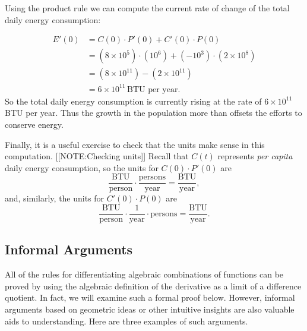 Using the product rule we can compute the current rate of change of
the total daily energy consumption:



\mbox{}



\begin{align*}
E'(0) &= C(0) \cdot P'(0) + C'(0) \cdot P(0) \\
      &= (8 \times 10^{5})\cdot (10^{6}) + (-10^{3})\cdot(2 \times 10^{8}) \\
      &= (8 \times 10^{11}) - (2 \times 10^{11}) \\
      &= 6 \times 10^{11} \, \mbox{BTU per year}.
\end{align*}
So the total daily energy consumption is currently rising at the rate
of $6 \times 10^{11}$ BTU per year.  Thus the growth in the population
more than offsets the efforts to conserve energy.

	Finally, it is a useful exercise to check that the units make sense in this computation.  
	[[NOTE:Checking units]]	
Recall that $C(t)$ represents {\em per capita} daily energy consumption, so the units for $C(0) \cdot P'(0)$ are
\[
\frac{\mbox {BTU}}{\mbox {person}} \cdot \frac{\mbox{persons}}{\mbox{year}} = \frac{\mbox{BTU}}{\mbox{year}},
\]
and, similarly, the units for $C'(0) \cdot P(0)$ are
\[
\frac{\mbox{BTU}}{\mbox{person}} \cdot \frac{1}{\mbox{year}} \cdot 
{\mbox {persons}} = \frac{\mbox{BTU}}{\mbox{year}}.
\]


\subsection{Informal Arguments}
\label{subsec:informal-arguments}

	All of the rules for differentiating algebraic combinations of functions can be proved by using the algebraic definition of the derivative as a limit of a difference quotient.  In fact, we will examine such a formal proof below.  However, informal arguments based on geometric ideas or other intuitive insights are also valuable aids to understanding.  Here are three examples of such arguments.

